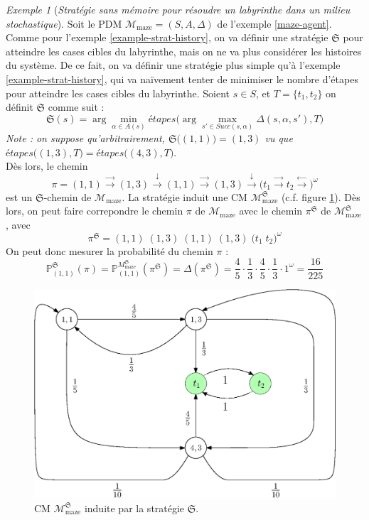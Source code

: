 \documentclass[12pt,a4paper]{report}
\theoremstyle{definition}%
\theoremstyle{remark}
\newtheorem{example}{Exemple}[chapter]
\newcommand{\pr}{\mathbb{P}}
\begin{document}
\begin{example}[\textit{Stratégie sans mémoire pour résoudre un labyrinthe
dans un milieu stochastique}]
	Soit le PDM $\mathcal{M}_{\text{maze}} = (S, A, \Delta)$ de l'exemple
	\ref{maze-agent}.
	Comme pour l'exemple \ref{example-strat-history}, on va définir une stratégie
	$\mathfrak{S}$ pour atteindre les cases cibles du labyrinthe, mais on ne va
	plus considérer les histoires du système.
	De ce fait, on va définir une stratégie plus simple qu'à l'exemple
	\ref{example-strat-history}, qui va naïvement tenter de minimiser le nombre
	d'étapes pour atteindre les cases cibles du labyrinthe.
	Soient $s \in S$, et $T = \{t_1, t_2 \}$ on définit $\mathfrak{S}$ comme
	suit :
	\[
		\mathfrak{S}(s) = \arg \min_{\alpha \in A(s)} \textit{étapes}\big(
			\arg \max_{s' \in Succ(s, \alpha)} \Delta(s, \alpha, s'), T\big)
	\]
	\textit{Note : on suppose qu'arbitrairement,
	$\mathfrak{S}\big((1, 1)\big) = (1, 3)$ vu que $\textit{étapes}\big((1, 3), T\big)
	= \textit{étapes}\big((4, 3), T\big)$}.\\
	Dès lors, le chemin
	\[
		\pi = (1, 1) \xrightarrow{\rightarrow} (1, 3) \xrightarrow{\downarrow} (1, 1) \xrightarrow{\rightarrow} (1, 3) \xrightarrow{\downarrow}
		\big(t_1 \xrightarrow{\rightarrow} t_2
		\xrightarrow{\leftarrow} \big)^\omega
	\]
	est un $\mathfrak{S}$-chemin de $\mathcal{M}_{\text{maze}}$. La stratégie
	induit une CM $\mathcal{M}_{\text{maze}}^\mathfrak{S}$ (c.f. figure
	\ref{CM-induite-strat-2}).
	Dès lors, on peut faire correpondre le chemin $\pi$ de
	$\mathcal{M}_{\text{maze}}$ avec le chemin $\pi^\mathfrak{S}$
	de $\mathcal{M}_{\text{maze}}^\mathfrak{S}$, avec
	\[
		\pi^\mathfrak{S} = (1, 1) \; (1, 3) \; (1, 1) \; (1, 3) \; \big( t_1 \; t_2 \big)^\omega
	\]
	On peut donc mesurer la probabilité du chemin $\pi$ :
	\[
		\pr^\mathfrak{S}_{(1, 1)}(\pi) =
		 \pr^{{M}_{\text{maze}}^\mathfrak{S}}_{(1,1)}(\pi^\mathfrak{S})
		 = \Delta(\pi^\mathfrak{S}) = \frac{4}{5} \cdot \frac{1}{3} \cdot \frac{4}{5} \cdot \frac{1}{3} \cdot 1^\omega = \frac{16}{225}
	\]
	\begin{figure}[H]
		\centering
		\captionsetup{justification=centering}
		\includegraphics[scale=0.5]{figures/maze-PDM-inducted-S}
		\caption{CM $\mathcal{M}_{\text{maze}}^\mathfrak{S}$ induite par la stratégie $\mathfrak{S}$.}
		\label{CM-induite-strat-2}
	\end{figure}



\end{example}
\end{document}
